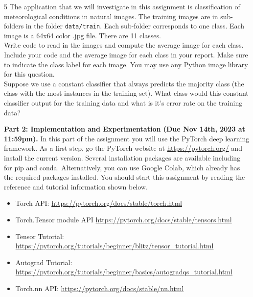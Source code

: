 \documentclass[11pt]{article}
\begin{document}
\begin{problem}{5} The application that we will investigate in this assignment is classification of meteorological conditions in natural images. The training images are in sub-folders in the folder \verb|data/train|. Each sub-folder corresponds to one class. Each image is a 64x64 color .jpg file. There are 11 classes. \\

 Write code to read in the images and compute the average image for each class. Include your code and the average image for each class in your report. Make sure to indicate the class label for each image. You may use any Python image library for this question.\\

 Suppose we use a constant classifier that always predicts the majority class (the class with the most instances in the training set). What class would this constant classifier output for the training data and what is it's error rate on the training data?
\end{problem}


\vspace{1em}
\textbf{Part 2: Implementation and Experimentation (Due Nov 14th, 2023 at 11:59pm).} In this part of the assignment you will use the PyTorch deep learning framework. As a first step, go the PyTorch website at \url{https://pytorch.org/} and install the current version. Several installation packages are available including for pip and conda. Alternatively, you can use Google Colab, which already has the required packages installed. You should start this assignment by reading the reference and tutorial information shown below. 

\begin{itemize}
\item Torch API: \url{https://pytorch.org/docs/stable/torch.html}
\item Torch.Tensor module API \url{https://pytorch.org/docs/stable/tensors.html}
\item Tensor Tutorial: \url{https://pytorch.org/tutorials/beginner/blitz/tensor_tutorial.html}
\item Autograd Tutorial: \url{https://pytorch.org/tutorials/beginner/basics/autogradqs_tutorial.html}
\item Torch.nn API: \url{https://pytorch.org/docs/stable/nn.html}
\end{itemize}
\end{document}

